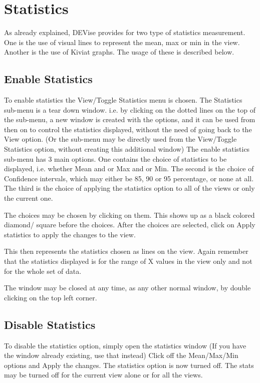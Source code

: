 \section{Statistics}

As already explained, DEVise provides for two type of statistics
measurement. One is the use of visual lines to represent the mean, max
or min in the view. Another is the use of Kiviat graphs. The usage of
these is described below.

\subsection{Enable Statistics}

To enable statistics the View/Toggle Statistics menu is chosen. The
Statistics sub-menu is a tear down window. i.e. by clicking on the
dotted lines on the top of the sub-menu, a new window is created with
the options, and it can be used from then on to control the statistics
displayed, without the need of going back to the View option. (Or the
sub-menu may be directly used from the View/Toggle Statistics option,
without creating this additional window) The enable statistics sub-menu
has 3 main options. One contains the choice of statistics to be
displayed, i.e. whether Mean and or Max and or Min. The second is the
choice of Confidence intervals, which may either be 85, 90 or 95
percentage, or none at all. The third is the choice of applying the
statistics option to all of the views or only the current one.

The choices may be chosen by clicking on them. This shows up as a
black colored diamond/ square before the choices. After the choices
are selected, click on Apply statistics to apply the changes to the
view.

This then represents the statistics chosen as lines on the view. Again
remember that the statistics displayed is for the range of X values in
the view only and not for the whole set of data.

The window may be closed at any time, as any other normal window, by
double clicking on the top left corner.

\subsection{Disable Statistics}

To disable the statistics option, simply open the statistics window
(If you have the window already existing, use that instead) Click off
the Mean/Max/Min options and Apply the changes. The statistics option
is now turned off. The stats may be turned off for the current view
alone or for all the views.

